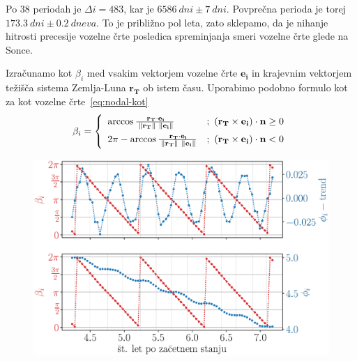 \documentclass[a4paper,12pt]{article}
\renewcommand{\vec}[1]{\mathbf{#1}} %
\begin{document}
\noindent
Po 38 periodah je $\Delta i = 483$, kar je $\SI{6586}{dni}\pm\SI{7}{dni}$.
Povprečna perioda je torej $\SI{173.3}{dni}\pm\SI{0.2}{dneva}$. To je približno
pol leta, zato sklepamo, da je nihanje hitrosti precesije vozelne črte 
posledica spreminjanja smeri vozelne črte glede na Sonce.

Izračunamo kot $\beta_i$ med vsakim vektorjem vozelne črte $\vec{e_i}$ in 
krajevnim vektorjem težišča sistema Zemlja-Luna $\vec{r_T}$ ob istem času. 
Uporabimo podobno formulo kot za kot vozelne črte~\eqref{eq:nodal-kot}
\begin{equation*}
    \beta_i = \left\{
        \begin{array}{ll}
            \arccos{\frac{\: \vec{r_T} \cdot \vec{e_i}}
            {\; \norm{\vec{r_T}} \ \norm{\vec{e_i}}}} & 
            {;\ (\vec{r_T}\times\vec{e_i})\cdot\vec{n} \geq 0} \vspace{0.5em} \\
            2\pi - \arccos{\frac{\: \vec{r_T} \cdot \vec{e_i}}
            {\; \norm{\vec{r_T}} \ \norm{\vec{e_i}}}} & 
            {;\ (\vec{r_T}\times\vec{e_i})\cdot\vec{n} < 0}
        \end{array}
    \right.
\end{equation*}

\newpage

\begin{figure}[h!]
    \centering
    \includegraphics[scale=0.59]{slikep/nodal-angle-comp.eps}
    \label{fig:nodal-angle-comp}
\end{figure}
\end{document}
